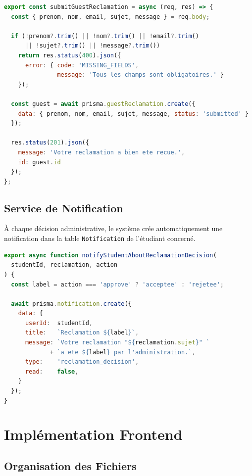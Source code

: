 \begin{lstlisting}[language=JavaScript,
  caption=request.controller.ts — Réclamation visiteur (sans authentification)]
export const submitGuestReclamation = async (req, res) => {
  const { prenom, nom, email, sujet, message } = req.body;

  if (!prenom?.trim() || !nom?.trim() || !email?.trim()
      || !sujet?.trim() || !message?.trim())
    return res.status(400).json({
      error: { code: 'MISSING_FIELDS',
               message: 'Tous les champs sont obligatoires.' }
    });

  const guest = await prisma.guestReclamation.create({
    data: { prenom, nom, email, sujet, message, status: 'submitted' }
  });

  res.status(201).json({
    message: 'Votre reclamation a bien ete recue.',
    id: guest.id
  });
};
\end{lstlisting}

\subsection{Service de Notification}

À chaque décision administrative, le système crée automatiquement une
notification dans la table \texttt{Notification} de l'étudiant concerné.

\begin{lstlisting}[language=JavaScript,
  caption=reclamation.service.ts — Notification automatique à l'étudiant]
export async function notifyStudentAboutReclamationDecision(
  studentId, reclamation, action
) {
  const label = action === 'approve' ? 'acceptee' : 'rejetee';

  await prisma.notification.create({
    data: {
      userId:  studentId,
      title:   `Reclamation ${label}`,
      message: `Votre reclamation "${reclamation.sujet}" `
             + `a ete ${label} par l'administration.`,
      type:    'reclamation_decision',
      read:    false,
    }
  });
}
\end{lstlisting}

\section{Implémentation Frontend}

\subsection{Organisation des Fichiers}

